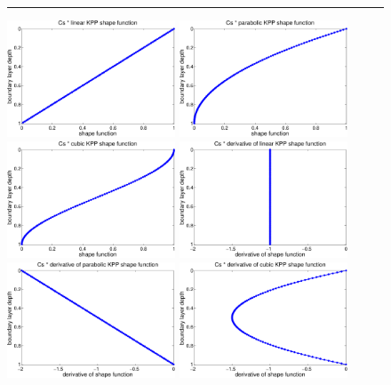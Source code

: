 \begin{figure}[h!t]
\rule{\textwidth}{0.005in}
\begin{center}
\includegraphics[angle=0,width=5cm]{./figs/KPPmod_linear_Gfunction.pdf}
\includegraphics[angle=0,width=5cm]{./figs/KPPmod_parabolic_Gfunction.pdf}
\includegraphics[angle=0,width=5cm]{./figs/KPPmod_cubic_Gfunction.pdf}
\includegraphics[angle=0,width=5cm]{./figs/KPPmod_linear_Gprime.pdf}
\includegraphics[angle=0,width=5cm]{./figs/KPPmod_parabolic_Gprime.pdf}
\includegraphics[angle=0,width=5cm]{./figs/KPPmod_cubic_Gprime.pdf}

\end{center}
\end{figure}
